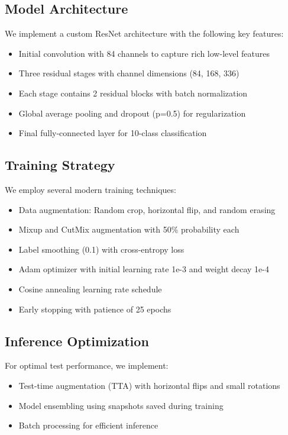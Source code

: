 \documentclass[letterpaper]{article} %
\begin{document}
\subsection{Model Architecture}
We implement a custom ResNet architecture with the following key features:
\begin{itemize}
    \item Initial convolution with 84 channels to capture rich low-level features
    \item Three residual stages with channel dimensions (84, 168, 336)
    \item Each stage contains 2 residual blocks with batch normalization
    \item Global average pooling and dropout (p=0.5) for regularization
    \item Final fully-connected layer for 10-class classification
\end{itemize}

\subsection{Training Strategy}
We employ several modern training techniques:
\begin{itemize}
    \item Data augmentation: Random crop, horizontal flip, and random erasing
    \item Mixup and CutMix augmentation with 50\% probability each
    \item Label smoothing (0.1) with cross-entropy loss
    \item Adam optimizer with initial learning rate 1e-3 and weight decay 1e-4
    \item Cosine annealing learning rate schedule
    \item Early stopping with patience of 25 epochs
\end{itemize}

\subsection{Inference Optimization}
For optimal test performance, we implement:
\begin{itemize}
    \item Test-time augmentation (TTA) with horizontal flips and small rotations
    \item Model ensembling using snapshots saved during training
    \item Batch processing for efficient inference
\end{itemize}
\end{document}

